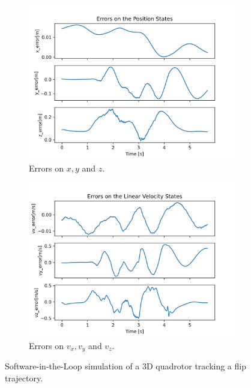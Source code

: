 \documentclass{thesisreport}
\begin{document}
\begin{figure}[H]
\medskip
	\begin{subfigure}{0.43\textwidth}
		\includegraphics[width=\linewidth]{Images/sil_simulations/Errors_position.png}
		\caption{Errors on $x,y$ and $z$.} \label{fig:SIL_3D_flip_errors_pose}
	\end{subfigure}\hspace*{\fill}
	\begin{subfigure}{0.43\textwidth}
		\includegraphics[width=\linewidth]{Images/sil_simulations/Errors_velocities.png}
		\caption{Errors on $v_x, v_y$ and $v_z$.} \label{fig:SIL_3D_flip_errors_velocities}
	\end{subfigure}

	\caption{Software-in-the-Loop simulation of a 3D quadrotor tracking a flip trajectory.} \label{fig:SIL_flip}
\end{figure}
\end{document}
